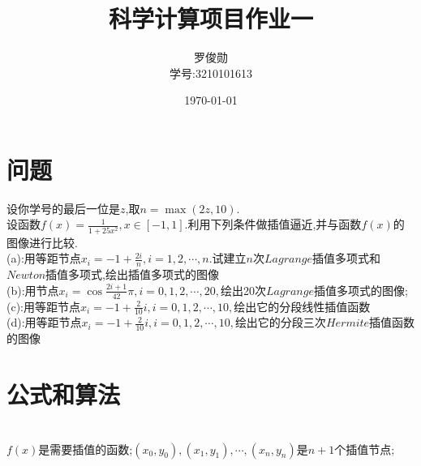 \documentclass[12pt, a4paper, oneside]{ctexart}
\title{\huge\textbf{科学计算项目作业一}}
\author{罗俊勋\\学号:3210101613}
\date{\today}
\begin{document}
\maketitle

\section*{问题}
设你学号的最后一位是$z$,取$n = \max (2z,10).$\\
设函数$f(x)=\frac{1}{1+25x^2},x\in {[-1,1]}$.利用下列条件做插值逼近,并与函数$f(x)$的图像进行比较.\\

(a):用等距节点$x_i=-1+\frac{2i}{n},i=1,2,\cdots,n$.试建立$n$次$Lagrange$插值多项式和$Newton$插值多项式,绘出插值多项式的图像\\

(b):用节点$x_i=\cos{\frac{2i+1}{42}\pi},i = 0,1,2,\cdots ,20,$绘出20次$Lagrange$插值多项式的图像;\\

(c):用等距节点$x_i=-1+\frac{2}{10}i,i=0,1,2,\cdots,10,$绘出它的分段线性插值函数\\

(d):用等距节点$x_i=-1+\frac{2}{10}i,i=0,1,2,\cdots,10,$绘出它的分段三次$Hermite$插值函数的图像

\pagebreak
\section*{公式和算法}

{\color{red}{$Lagrange$插值原理:}}\\
{{$f(x)$是需要插值的函数;$(x_0,y_0),(x_1,y_1),\cdots,(x_n,y_n)$是$n+1$个插值节点};
}
\vspace*{10pt}
\end{document}
